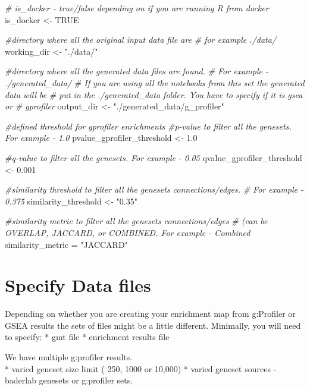 \documentclass[
]{book}
\newenvironment{Shaded}{\begin{snugshade}}{\end{snugshade}}
\newcommand{\CommentTok}[1]{\textcolor[rgb]{0.56,0.35,0.01}{\textit{#1}}}
\newcommand{\ConstantTok}[1]{\textcolor[rgb]{0.56,0.35,0.01}{#1}}
\newcommand{\FloatTok}[1]{\textcolor[rgb]{0.00,0.00,0.81}{#1}}
\newcommand{\NormalTok}[1]{#1}
\newcommand{\OtherTok}[1]{\textcolor[rgb]{0.56,0.35,0.01}{#1}}
\newcommand{\StringTok}[1]{\textcolor[rgb]{0.31,0.60,0.02}{#1}}
\begin{document}
\begin{Shaded}
\begin{Highlighting}[]
\CommentTok{\# is\_docker {-} true/false depending on if you are running R from docker}
\NormalTok{is\_docker }\OtherTok{\textless{}{-}} \ConstantTok{TRUE}

\CommentTok{\#directory where all the original input data file are}
\CommentTok{\# for example ./data/}
\NormalTok{working\_dir }\OtherTok{\textless{}{-}} \StringTok{"./data/"}


\CommentTok{\#directory where all the generated data files are found.}
\CommentTok{\# For example {-} ./generated\_data/}
\CommentTok{\# If you are using all the notebooks from this set the generated data will be}
\CommentTok{\# put in the ./generated\_data folder.  You have to specify if it is gsea or }
\CommentTok{\# gprofiler}
\NormalTok{output\_dir }\OtherTok{\textless{}{-}} \StringTok{"./generated\_data/g\_profiler"}


\CommentTok{\#defined threshold for gprofiler enrichments }
\CommentTok{\#p{-}value to filter all the genesets.  For example {-}   1.0}
\NormalTok{pvalue\_gprofiler\_threshold }\OtherTok{\textless{}{-}} \FloatTok{1.0}

\CommentTok{\#q{-}value to filter all the genesets.  For example {-}   0.05}
\NormalTok{qvalue\_gprofiler\_threshold }\OtherTok{\textless{}{-}} \FloatTok{0.001}

\CommentTok{\#similarity threshold to filter all the genesets connections/edges.  }
\CommentTok{\# For example {-}   0.375}
\NormalTok{similarity\_threshold }\OtherTok{\textless{}{-}} \StringTok{"0.35"}

\CommentTok{\#similarity metric to filter all the genesets connections/edges }
\CommentTok{\# (can be OVERLAP, JACCARD, or COMBINED.   For example {-}   Combined}
\NormalTok{similarity\_metric }\OtherTok{=} \StringTok{"JACCARD"}
\end{Highlighting}
\end{Shaded}

\section{Specify Data files}\label{specify-data-files}

Depending on whether you are creating your enrichment map from g:Profiler or GSEA results the sets of files might be a little different. Minimally, you will need to specify:
* gmt file
* enrichment results file

We have multiple g:profiler results.\\
* varied geneset size limit ( 250, 1000 or 10,000)
* varied geneset sources - baderlab genesets or g:profiler sets.
\end{document}

